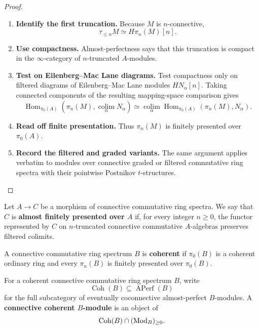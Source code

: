 \begin{proof}
\leavevmode
\begin{enumerate}[label=\textup{(\arabic*)}]
    \item \textbf{Identify the first truncation.}
    Because \(M\) is \(n\)-connective,
    \[
        \tau_{\leq n}M
        \simeq
        H\pi_n(M)[n].
    \]
    \item \textbf{Use compactness.}
    Almost-perfectness says that this truncation is compact in the
    \(\infty\)-category of \(n\)-truncated \(A\)-modules.
    \item \textbf{Test on Eilenberg--Mac Lane diagrams.}
    Test compactness only on
    filtered diagrams of Eilenberg--Mac Lane modules \(HN_\alpha[n]\). Taking
    connected components of the resulting mapping-space comparison gives
    \[
        \operatorname{Hom}_{\pi_0(A)}
        \left(\pi_n(M),\operatorname*{colim}_\alpha N_\alpha\right)
        \simeq
        \operatorname*{colim}_\alpha
        \operatorname{Hom}_{\pi_0(A)}(\pi_n(M),N_\alpha).
    \]
    \item \textbf{Read off finite presentation.}
    Thus \(\pi_n(M)\) is finitely presented over \(\pi_0(A)\).
    \item \textbf{Record the filtered and graded variants.}
    The same argument
    applies verbatim to modules over connective graded or filtered commutative ring
    spectra with their pointwise Postnikov \(t\)-structures.
\end{enumerate}
\end{proof}

\begin{definition}
\label{def:almost-finite-presentation}
Let \(A\to C\) be a morphism of connective commutative ring spectra. We say
that \(C\) is \textbf{almost finitely presented over \(A\)} if, for every
integer \(n\geq0\), the functor represented by \(C\) on \(n\)-truncated
connective commutative \(A\)-algebras preserves filtered colimits.
\end{definition}

\begin{definition}
\label{def:coherent-commutative-ring-spectrum}
A connective commutative ring spectrum \(B\) is \textbf{coherent} if
\(\pi_0(B)\) is a coherent ordinary ring and every \(\pi_n(B)\) is finitely
presented over \(\pi_0(B)\).
\end{definition}

\begin{definition}
\label{def:coherent-module}
For a coherent connective commutative ring spectrum \(B\), write
\[
    \operatorname{Coh}(B)
    \subseteq
    \operatorname{APerf}(B)
\]
for the full subcategory of eventually coconnective almost-perfect
\(B\)-modules. A \textbf{connective coherent \(B\)-module} is an object of
\[
    \operatorname{Coh}(B)\cap(\operatorname{Mod}_B)_{\geq0}.
\]
\end{definition}

